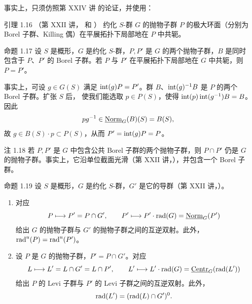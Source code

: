 事实上，只须仿照第 XXIV 讲  的论证，并使用：
\begin{sgastatement}{引理 1.16 \textup{（第 XXII 讲， 和 ）}}
约化 \(S\)-群 \(G\) 的抛物子群 \(P\) 的极大环面（分别为 Borel 子群、Killing 偶）在平展拓扑下局部地在 \(P\) 中共轭。
\end{sgastatement}

\begin{sgastatement}{命题 1.17}
设 \(S\) 是概形，\(G\) 是约化 \(S\)-群，\(P,P'\) 是 \(G\) 的两个抛物子群，\(B\) 是同时包含于 \(P\)、\(P'\) 的 Borel 子群。若 \(P\) 与 \(P'\) 在平展拓扑下局部地在 \(G\) 中共轭，则 \(P=P'\)。
\end{sgastatement}

事实上，可设 \(g\in G(S)\) 满足 \(\operatorname{int}(g)P=P'\)。群 \(B\)、\(\operatorname{int}(g)^{-1}B\) 是 \(P\) 的两个 Borel 子群。扩张 \(S\) 后， 使我们能选取 \(p\in P(S)\)，使得 \(\operatorname{int}(p)\operatorname{int}(g^{-1})B=B\)。因此
\[
 pg^{-1}\in\underline{\operatorname{Norm}}_G(B)(S)=B(S),
\]
故 \(g\in B(S)\cdot p\subset P(S)\)，从而 \(P'=\operatorname{int}(g)P=P\)。

\begin{sgastatement}{注 1.18}
若 \(P,P'\) 是 \(G\) 中包含公共 Borel 子群的两个抛物子群，则 \(P\cap P'\) 仍是 \(G\) 的抛物子群。事实上，它沿单位截面光滑（第 XXII 讲，），并包含一个 Borel 子群。
\end{sgastatement}

\begin{sgastatement}{命题 1.19}
设 \(S\) 是概形，\(G\) 是约化 \(S\)-群，\(G'\) 是它的导群（第 XXII 讲，）。
\begin{enumerate}[label=\textup{(\roman*)}]
\item 对应
\[
 P\longmapsto P'=P\cap G',
 \qquad
 P'\longmapsto P'\cdot\operatorname{rad}(G)=\underline{\operatorname{Norm}}_G(P')
\]
给出 \(G\) 的抛物子群与 \(G'\) 的抛物子群之间的互逆双射。此外，\(\operatorname{rad}^u(P)=\operatorname{rad}^u(P')\)。
\item 设 \(P\) 是 \(G\) 的抛物子群，\(P'=P\cap G'\)。对应
\[
 L\longmapsto L'=L\cap G'=L\cap P',
 \qquad
 L'\longmapsto L'\cdot\operatorname{rad}(G)=\underline{\operatorname{Centr}}_G(\operatorname{rad}(L'))
\]
给出 \(P\) 的 Levi 子群与 \(P'\) 的 Levi 子群之间的互逆双射。此外，
\[
 \operatorname{rad}(L')=(\operatorname{rad}(L)\cap G')^0.
\]
\end{enumerate}
\end{sgastatement}

